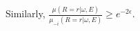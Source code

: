 Similarly,  $\frac{\mu(R=r | \omega, E)}{\mu_{-i}(R=r | \omega, E)} \geq e^{-2\epsilon}$.


\begin{comment}
\begin{align*}
    \frac{\mu(R=r | \omega, E)}{\mu_{-i}(R=r | \omega, E)} &=
    \frac{\sum_{z \in \mathcal{D}}\mu(R=r, E, z) Pr[M(z)=\omega]/\sum_{y \in \mathcal{D}}\mu(E, y)Pr[M(y)=\omega]}{\sum_{z \in \mathcal{D}}\mu(R=r, E, z) Pr[M(\tilde{z})=\omega] / \sum_{y \in \mathcal{D}}\mu(E, y)Pr[M(\tilde{y})=\omega]}\\
    &= \frac{\sum_{z \in \mathcal{D}}\mu(R=r, E, z) Pr[M(z)=\omega] / \sum_{z \in \mathcal{D}}\mu(R=r, E, z) Pr[M(\tilde{z})=\omega] }{\sum_{y \in \mathcal{D}}\mu(E, y)Pr[M(y)=\omega] / \sum_{y \in \mathcal{D}}\mu(E, y)Pr[M(\tilde{y})=\omega] } \in [e^{-2\epsilon}, e^{2\epsilon}]
\end{align*}
The inequality bounds follow since $\frac{Pr[M(z)=\omega]}{Pr[M(\tilde{z})=\omega]} \in [e^{-\epsilon}, e^\epsilon]$ and $\frac{Pr[M(y)=\omega]}{Pr[M(\tilde{y})=\omega]} \in [e^{-\epsilon}, e^\epsilon]$ given that $z$ and $\tilde{z}$ (resp. $y$ and $\tilde{y}$) differ by a single record and $M$ is bounded $\epsilon$-differentially private.
\end{comment}


